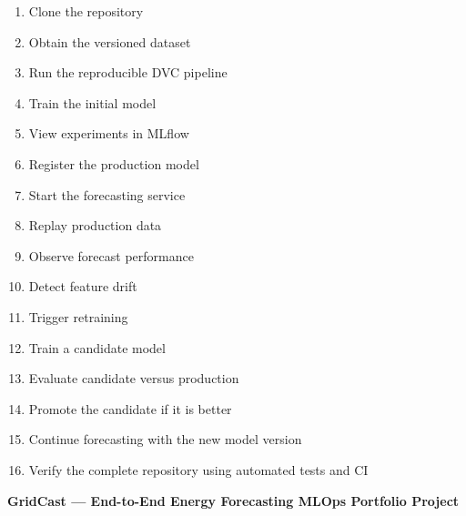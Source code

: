 \documentclass[11pt,a4paper]{article}
\newcommand{\projectname}{GridCast}
\begin{document}
\begin{enumerate}
    \item Clone the repository
    \item Obtain the versioned dataset
    \item Run the reproducible DVC pipeline
    \item Train the initial model
    \item View experiments in MLflow
    \item Register the production model
    \item Start the forecasting service
    \item Replay production data
    \item Observe forecast performance
    \item Detect feature drift
    \item Trigger retraining
    \item Train a candidate model
    \item Evaluate candidate versus production
    \item Promote the candidate if it is better
    \item Continue forecasting with the new model version
    \item Verify the complete repository using automated tests and CI
\end{enumerate}

\vfill

\begin{center}
    \textbf{\projectname{} --- End-to-End Energy Forecasting MLOps Portfolio Project}
\end{center}
\end{document}
